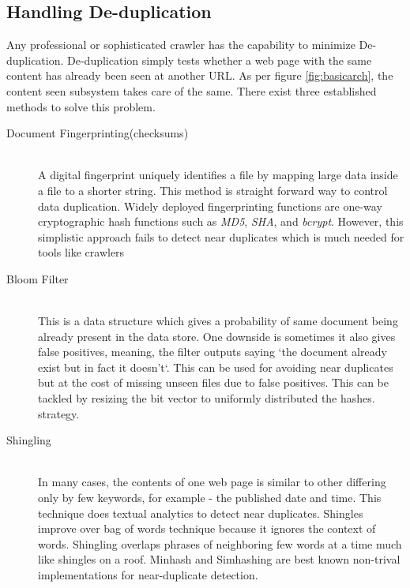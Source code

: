 \subsection{Handling De-duplication}
Any professional or sophisticated crawler has the capability to minimize De-duplication. De-duplication
simply tests whether a web page with the same content has already been seen at another URL. As per
figure \ref{fig:basicarch}, the content seen subsystem takes care of the same. There exist three
established methods to solve this problem. 

\begin{description}
\item[Document Fingerprinting(checksums)] \hfill \\
  A digital fingerprint uniquely identifies a file by mapping large data inside a file to a shorter
  string. This method is straight forward way to control data duplication. Widely deployed fingerprinting
  functions are one-way cryptographic hash functions such as \textit{MD5}, \textit{SHA}, and
  \textit{bcrypt}. However, this simplistic approach fails to detect near duplicates which is much needed
  for tools like crawlers\\ 
\item[Bloom Filter] \hfill \\
  This is a data structure which gives a probability of same document being already present in the data
  store. One downside is sometimes it also gives false positives, meaning, the filter outputs saying
  `the document already exist but in fact it doesn't`. This can be used for avoiding near duplicates but
  at the cost of missing unseen files due to false positives. This can be tackled by resizing the bit vector to uniformly distributed the hashes.
  strategy.
\item[Shingling] \hfill \\
  In many cases, the contents of one web page is similar to other differing only by few keywords, for
  example - the published date and time. This technique does textual analytics to detect near duplicates.
  Shingles\cite{dedupe} improve over bag of words technique because it ignores the context of
  words. Shingling overlaps phrases of neighboring few words at a time much like shingles on a roof.
  Minhash \cite{dedupe} and Simhashing \cite{simhash} are best known non-trival implementations for near-duplicate detection.
\end{description}

\pagebreak


